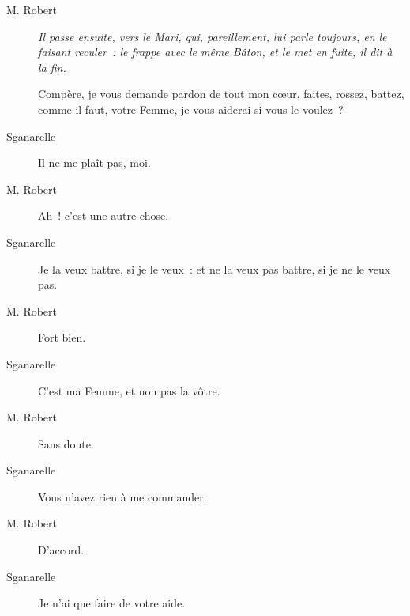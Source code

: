 \documentclass[french,twoside]{book} %
\begin{document}
 \begin{description} \item[M. Robert] \textit{Il passe ensuite, vers le Mari, qui, pareillement, lui parle toujours, en le faisant reculer : le frappe avec le même Bâton, et le met en fuite, il dit à la fin.} 

Compère, je vous demande pardon de tout mon cœur, faites, rossez, battez, comme il faut, votre Femme, je vous aiderai si vous le voulez ?\end{description}
 \begin{description} \item[Sganarelle] 

Il ne me plaît pas, moi.\end{description}
 \begin{description} \item[M. Robert] 

Ah ! c’est une autre chose.\end{description}
 \begin{description} \item[Sganarelle] 

Je la veux battre, si je le veux : et ne la veux pas battre, si je ne le veux pas.\end{description}
 \begin{description} \item[M. Robert] 

Fort bien.\end{description}
 \begin{description} \item[Sganarelle] 

C’est ma Femme, et non pas la vôtre.\end{description}
 \begin{description} \item[M. Robert] 

Sans doute.\end{description}
 \begin{description} \item[Sganarelle] 

Vous n’avez rien à me commander.\end{description}
 \begin{description} \item[M. Robert] 

D’accord.\end{description}
 \begin{description} \item[Sganarelle] 

Je n’ai que faire de votre aide.\end{description}
\end{document}
